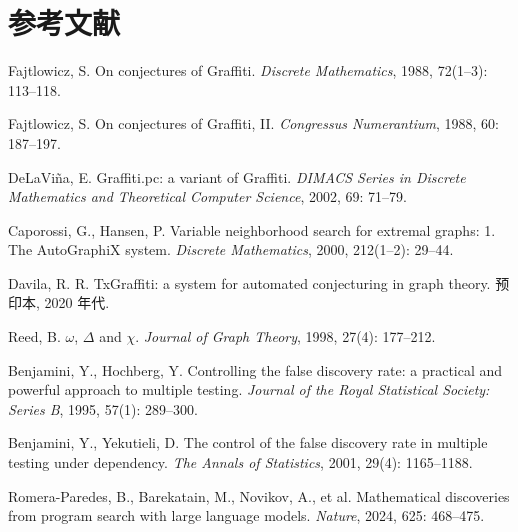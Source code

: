 \section*{参考文献}

\begin{sloppypar}
\begin{enumerate}[label={[\arabic*]}, leftmargin=2.6em, itemsep=3pt]

\item Fajtlowicz, S. On conjectures of Graffiti. \emph{Discrete Mathematics}, 1988, 72(1--3): 113--118.

\item Fajtlowicz, S. On conjectures of Graffiti, II. \emph{Congressus Numerantium}, 1988, 60: 187--197.

\item DeLaViña, E. Graffiti.pc: a variant of Graffiti. \emph{DIMACS Series in Discrete Mathematics and Theoretical Computer Science}, 2002, 69: 71--79.

\item Caporossi, G., Hansen, P. Variable neighborhood search for extremal graphs: 1. The AutoGraphiX system. \emph{Discrete Mathematics}, 2000, 212(1--2): 29--44.

\item Davila, R. R. TxGraffiti: a system for automated conjecturing in graph theory. 预印本, 2020 年代.

\item Reed, B. $\omega$, $\Delta$ and $\chi$. \emph{Journal of Graph Theory}, 1998, 27(4): 177--212.

\item Benjamini, Y., Hochberg, Y. Controlling the false discovery rate: a practical and powerful approach to multiple testing. \emph{Journal of the Royal Statistical Society: Series B}, 1995, 57(1): 289--300.

\item Benjamini, Y., Yekutieli, D. The control of the false discovery rate in multiple testing under dependency. \emph{The Annals of Statistics}, 2001, 29(4): 1165--1188.

\item Romera-Paredes, B., Barekatain, M., Novikov, A., et al. Mathematical discoveries from program search with large language models. \emph{Nature}, 2024, 625: 468--475.


\end{enumerate}
\end{sloppypar}
